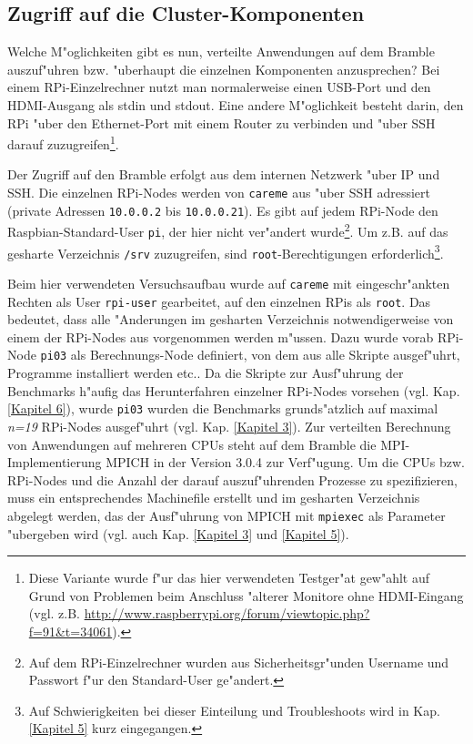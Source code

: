 \subsection{Zugriff auf die Cluster-Komponenten}\label{Bramble Zugriff}

Welche M"oglichkeiten gibt es nun, verteilte Anwendungen auf dem Bramble auszuf"uhren bzw. "uberhaupt die einzelnen Komponenten anzusprechen? Bei einem RPi-Einzelrechner nutzt man normalerweise einen USB-Port und den HDMI-Ausgang als stdin und stdout. Eine andere M"oglichkeit besteht darin, den RPi "uber den Ethernet-Port mit einem Router zu verbinden und "uber SSH darauf zuzugreifen\footnote{Diese Variante wurde f"ur das hier verwendeten Testger"at gew"ahlt auf Grund von Problemen beim Anschluss "alterer Monitore ohne HDMI-Eingang (vgl. z.B. \url{http://www.raspberrypi.org/forum/viewtopic.php?f=91&t=34061}).}. 

Der Zugriff auf den Bramble erfolgt aus dem internen Netzwerk "uber IP und SSH. Die einzelnen RPi-Nodes werden von \texttt{careme} aus "uber SSH adressiert (private Adressen \texttt{10.0.0.2} bis \texttt{10.0.0.21}). Es gibt auf jedem RPi-Node den Raspbian-Standard-User \texttt{pi}, der hier nicht ver"andert wurde\footnote{Auf dem RPi-Einzelrechner wurden aus Sicherheitsgr"unden Username und Passwort f"ur den Standard-User ge"andert.}. Um z.B. auf das gesharte Verzeichnis \texttt{/srv} zuzugreifen, sind \texttt{root}-Berechtigungen erforderlich\footnote{Auf Schwierigkeiten bei dieser Einteilung und Troubleshoots wird in Kap. \ref{Kapitel 5} kurz eingegangen.}. 

Beim hier verwendeten Versuchsaufbau wurde auf \texttt{careme} mit eingeschr"ankten Rechten als User \texttt{rpi-user} gearbeitet, auf den einzelnen RPis als \texttt{root}. Das bedeutet, dass alle "Anderungen im gesharten Verzeichnis notwendigerweise von einem der RPi-Nodes aus vorgenommen werden m"ussen. Dazu wurde vorab RPi-Node \texttt{pi03} als Berechnungs-Node definiert, von dem aus alle Skripte ausgef"uhrt, Programme installiert werden etc.. Da die Skripte zur Ausf"uhrung der Benchmarks h"aufig das Herunterfahren einzelner RPi-Nodes vorsehen (vgl. Kap. \ref{Kapitel 6}), wurde \texttt{pi03} wurden die Benchmarks grunds"atzlich auf maximal \textit{n=19} RPi-Nodes ausgef"uhrt (vgl. Kap. \ref{Kapitel 3}). Zur verteilten Berechnung von Anwendungen auf mehreren CPUs steht auf dem Bramble die MPI-Implementierung MPICH in der Version 3.0.4 zur Verf"ugung. Um die CPUs bzw. RPi-Nodes und die Anzahl der darauf auszuf"uhrenden Prozesse zu spezifizieren, muss ein entsprechendes Machinefile erstellt und im gesharten Verzeichnis abgelegt werden, das der Ausf"uhrung von MPICH mit \texttt{mpiexec} als Parameter "ubergeben wird (vgl. auch Kap. \ref{Kapitel 3} und \ref{Kapitel 5}). 
\endinput 
